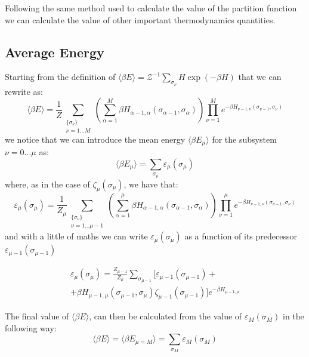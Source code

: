 Following the same method used to calculate the value of the partition function
we can calculate the value of other important thermodynamics quantities.

\subsection{Average Energy}

Starting from the definition of  $\langle\beta E\rangle = \mathcal{Z}^{-1}
\sum_{\sigma_\nu} H \exp(-\beta H)$ that we can rewrite as:
\begin{equation}
\langle \beta E \rangle=
\frac{1}{Z}
\sum_{\substack{\{\sigma_\nu\}\\\nu=1\dots M}} \left(
\sum_{\alpha=1}^M\beta H_{\alpha-1,\alpha}(\sigma_{\alpha-1},\sigma_\alpha)
\right)
\prod_{\nu=1}^M e^{-\beta H_{\nu-1,\nu}(\sigma_{\nu-1},\sigma_\nu)} 
\end{equation}
we notice that we can introduce the mean energy $\langle\beta E_\mu\rangle$ for the subsystem
$\nu=0\dots\mu$ as:
\begin{equation}
\langle \beta E_\mu \rangle =
\sum_{\sigma_\mu} 
\varepsilon_\mu(\sigma_\mu)
\end{equation}
where, as in the case of $\zeta_\mu(\sigma_\mu)$, we have that:
\begin{equation}
\varepsilon_\mu(\sigma_\mu)=
\frac 1{Z_\mu}
\sum_{\substack{\{\sigma_\nu\}\\\nu=1\dots\mu-1}}
\left(
\sum_{\alpha=1}^{\mu} \beta H_{\alpha-1,\alpha}(\sigma_{\alpha-1},\sigma_\alpha)
\right)
\prod_{\nu=1}^{\mu}
e^{-\beta H_{\nu-1,\nu}(\sigma_{\nu-1},\sigma_\nu)}
\end{equation}
and with a little of maths we can write $\varepsilon_\mu(\sigma_\mu)$ as a
function of its predecessor $\varepsilon_{\mu-1}(\sigma_{\mu-1})$


\begin{multline}
\varepsilon_\mu(\sigma_\mu)= 
\frac {Z_{\mu-1}}{Z_\mu} \sum_{\sigma_{\mu-1}} \Big[
\varepsilon_{\mu-1}(\sigma_{\mu-1})+\\
+\beta H_{\mu-1,\mu}(\sigma_{\mu-1},\sigma_\mu)\zeta_{\mu-1}(\sigma_{\mu-1})
\Big]e^{-\beta H_{\mu-1,\mu}}
\label{epsilon_mu}
\end{multline}

The final value of $\langle\beta E\rangle$, can then be calculated from the
value of $\varepsilon_M(\sigma_M)$ in the following way:
\begin{equation}
\langle \beta E\rangle =
\langle \beta E_{\mu=M} \rangle
=
\sum_{\sigma_M} \varepsilon_M(\sigma_M)
\label{mean_b_e}
\end{equation}




